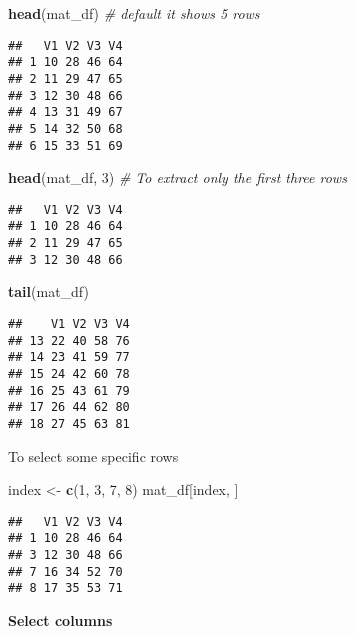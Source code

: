 \documentclass[]{book}
\newenvironment{Shaded}{\begin{snugshade}}{\end{snugshade}}
\newcommand{\CommentTok}[1]{\textcolor[rgb]{0.56,0.35,0.01}{\textit{#1}}}
\newcommand{\DecValTok}[1]{\textcolor[rgb]{0.00,0.00,0.81}{#1}}
\newcommand{\KeywordTok}[1]{\textcolor[rgb]{0.13,0.29,0.53}{\textbf{#1}}}
\newcommand{\NormalTok}[1]{#1}
\newcommand{\StringTok}[1]{\textcolor[rgb]{0.31,0.60,0.02}{#1}}
\begin{document}
\begin{Shaded}
\begin{Highlighting}[]
\KeywordTok{head}\NormalTok{(mat_df) }\CommentTok{# default it shows 5 rows}
\end{Highlighting}
\end{Shaded}

\begin{verbatim}
##   V1 V2 V3 V4
## 1 10 28 46 64
## 2 11 29 47 65
## 3 12 30 48 66
## 4 13 31 49 67
## 5 14 32 50 68
## 6 15 33 51 69
\end{verbatim}

\begin{Shaded}
\begin{Highlighting}[]
\KeywordTok{head}\NormalTok{(mat_df, }\DecValTok{3}\NormalTok{) }\CommentTok{# To extract only the first three rows }
\end{Highlighting}
\end{Shaded}

\begin{verbatim}
##   V1 V2 V3 V4
## 1 10 28 46 64
## 2 11 29 47 65
## 3 12 30 48 66
\end{verbatim}

\begin{Shaded}
\begin{Highlighting}[]
\KeywordTok{tail}\NormalTok{(mat_df)}
\end{Highlighting}
\end{Shaded}

\begin{verbatim}
##    V1 V2 V3 V4
## 13 22 40 58 76
## 14 23 41 59 77
## 15 24 42 60 78
## 16 25 43 61 79
## 17 26 44 62 80
## 18 27 45 63 81
\end{verbatim}

To select some specific rows

\begin{Shaded}
\begin{Highlighting}[]
\NormalTok{index <-}\StringTok{ }\KeywordTok{c}\NormalTok{(}\DecValTok{1}\NormalTok{, }\DecValTok{3}\NormalTok{, }\DecValTok{7}\NormalTok{, }\DecValTok{8}\NormalTok{)}
\NormalTok{mat_df[index, ]}
\end{Highlighting}
\end{Shaded}

\begin{verbatim}
##   V1 V2 V3 V4
## 1 10 28 46 64
## 3 12 30 48 66
## 7 16 34 52 70
## 8 17 35 53 71
\end{verbatim}

\textbf{Select columns}
\end{document}
